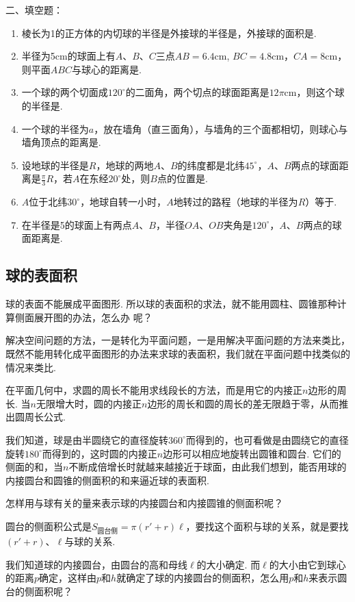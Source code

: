 二、填空题：
\begin{enumerate}
\item 棱长为1的正方体的内切球的半径是外接球的半径是\blank，外接球的面积是\blank.
\item 半径为5cm的球面上有$A$、$B$、$C$三点$AB=6.4$cm, $BC=4.8$cm，$CA=8$cm，则平面$ABC$与球心的距离是\blank.
\item 一个球的两个切面成$120^{\circ}$的二面角，两个切点的球面距离是$12\pi$cm，则这个球的半径是\blank.
\item 一个球的半径为$a$，放在墙角（直三面角），与墙角的三个面都相切，则球心与墙角顶点的距离是\blank.
\item 设地球的半径是$R$，地球的两地$A$、$B$的纬度都是北纬$45^{\circ}$，$A$、$B$两点的球面距离是$\frac{\pi}{3}R$，若$A$在东经$20^{\circ}$处，则$B$点的位置是\blank.
\item $A$位于北纬$30^{\circ}$，地球自转一小时，$A$地转过的路程（地球的半径为$R$）等于\blank.
\item 在半径是5的球面上有两点$A$、$B$，半径$OA$、$OB$夹角是$120^{\circ}$，$A$、$B$两点的球面距离是\blank.
\end{enumerate}


\subsection{球的表面积}
球的表面不能展成平面图形. 所以球的表面积的求法，就不能用圆柱、圆锥那种计算侧面展开图的办法，怎么办
呢？

解决空间问题的方法，一是转化为平面问题，一是用解决平面问题的方法来类比，既然不能用转化成平面图形的办法来求球的表面积，我们就在平面问题中找类似的情况来类比.

在平面几何中，求圆的周长不能用求线段长的方法，而是用它的内接正$n$边形的周长. 当$n$无限增大时，圆的内接正$n$边形的周长和圆的周长的差无限趋于零，从而推出圆周长公式.

我们知道，球是由半圆绕它的直径旋转$360^{\circ}$而得到的，也可看做是由圆绕它的直径旋转$180^{\circ}$而得到的，这时圆的内接正$n$边形可以相应地旋转出圆锥和圆台. 它们的侧面的和，当$n$不断成倍增长时就越来越接近于球面，由此我们想到，能否用球的内接圆台和圆锥的侧面积的和来逼近球的表面积.

怎样用与球有关的量来表示球的内接圆台和内接圆锥的侧面积呢？

圆台的侧面积公式是$S_{\text{圆台侧}}=\pi(r'+r)\ell$，要找这个面积与球的关系，就是要找$(r'+r)$、$\ell$与球的关系.

我们知道球的内接圆台，由圆台的高和母线$\ell$的大小确定. 而$\ell$的大小由它到球心的距离$p$确定，这样由$p$和$h$就确定了球的内接圆台的侧面积，怎么用$p$和$h$来表示圆台的侧面积呢？

